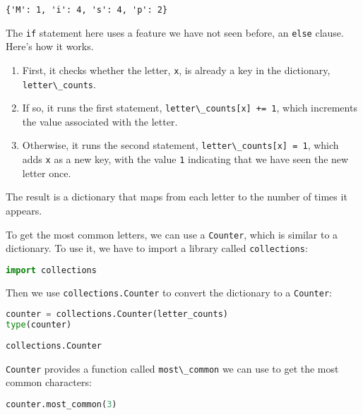 \begin{lstlisting}[]
{'M': 1, 'i': 4, 's': 4, 'p': 2}
\end{lstlisting}

The \passthrough{\lstinline!if!} statement here uses a feature we have
not seen before, an \passthrough{\lstinline!else!} clause. Here's how it
works.

\begin{enumerate}
\def\labelenumi{\arabic{enumi}.}
\item
  First, it checks whether the letter, \passthrough{\lstinline!x!}, is
  already a key in the dictionary,
  \passthrough{\lstinline!letter\_counts!}.
\item
  If so, it runs the first statement,
  \passthrough{\lstinline!letter\_counts[x] += 1!}, which increments the
  value associated with the letter.
\item
  Otherwise, it runs the second statement,
  \passthrough{\lstinline!letter\_counts[x] = 1!}, which adds
  \passthrough{\lstinline!x!} as a new key, with the value
  \passthrough{\lstinline!1!} indicating that we have seen the new
  letter once.
\end{enumerate}

The result is a dictionary that maps from each letter to the number of
times it appears.

To get the most common letters, we can use a
\passthrough{\lstinline!Counter!}, which is similar to a dictionary. To
use it, we have to import a library called
\passthrough{\lstinline!collections!}:

\begin{lstlisting}[language=Python]
import collections
\end{lstlisting}

Then we use \passthrough{\lstinline!collections.Counter!} to convert the
dictionary to a \passthrough{\lstinline!Counter!}:

\begin{lstlisting}[language=Python]
counter = collections.Counter(letter_counts)
type(counter)
\end{lstlisting}

\begin{lstlisting}[]
collections.Counter
\end{lstlisting}

\passthrough{\lstinline!Counter!} provides a function called
\passthrough{\lstinline!most\_common!} we can use to get the most common
characters:

\begin{lstlisting}[language=Python]
counter.most_common(3)
\end{lstlisting}

